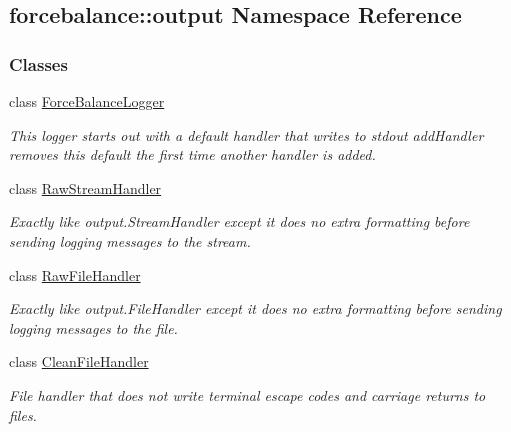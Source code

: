 \hypertarget{namespaceforcebalance_1_1output}{\subsection{forcebalance\-:\-:output \-Namespace \-Reference}
\label{namespaceforcebalance_1_1output}
}
\subsubsection*{\-Classes}
\begin{DoxyCompactItemize}
\item 
class \hyperlink{classforcebalance_1_1output_1_1ForceBalanceLogger}{\-Force\-Balance\-Logger}
\begin{DoxyCompactList}\small\item\em \-This logger starts out with a default handler that writes to stdout add\-Handler removes this default the first time another handler is added. \end{DoxyCompactList}\item 
class \hyperlink{classforcebalance_1_1output_1_1RawStreamHandler}{\-Raw\-Stream\-Handler}
\begin{DoxyCompactList}\small\item\em \-Exactly like output.\-Stream\-Handler except it does no extra formatting before sending logging messages to the stream. \end{DoxyCompactList}\item 
class \hyperlink{classforcebalance_1_1output_1_1RawFileHandler}{\-Raw\-File\-Handler}
\begin{DoxyCompactList}\small\item\em \-Exactly like output.\-File\-Handler except it does no extra formatting before sending logging messages to the file. \end{DoxyCompactList}\item 
class \hyperlink{classforcebalance_1_1output_1_1CleanFileHandler}{\-Clean\-File\-Handler}
\begin{DoxyCompactList}\small\item\em \-File handler that does not write terminal escape codes and carriage returns to files. \end{DoxyCompactList}\end{DoxyCompactItemize}
